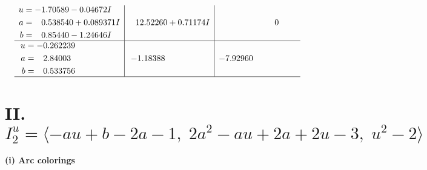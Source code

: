 \documentclass[1p]{elsarticle_modified}
\theoremstyle{definition}
\begin{document}
$$\begin{array}{c|c|c}
\begin{aligned}
u &= -1.70589 - 0.04672 I \\
a &= \phantom{-}0.538540 + 0.089371 I \\
b &= \phantom{-}0.85440 - 1.24646 I\end{aligned}
 & \phantom{-}12.52260 + 0.71174 I & \phantom{-0.000000 } 0 \\ \hline\begin{aligned}
u &= -0.262239\phantom{ +0.000000I} \\
a &= \phantom{-}2.84003\phantom{ +0.000000I} \\
b &= \phantom{-}0.533756\phantom{ +0.000000I}\end{aligned}
 & -1.18388\phantom{ +0.000000I} & -7.92960\phantom{ +0.000000I}\\
 \hline 
 \end{array}$$\newpage\newpage\renewcommand{\arraystretch}{1}
\centering \section*{II. $I^u_{2}= \langle - a u+b-2 a-1,\;2 a^2- a u+2 a+2 u-3,\;u^2-2 \rangle$}
\flushleft \textbf{(i) Arc colorings}\\
\end{document}
